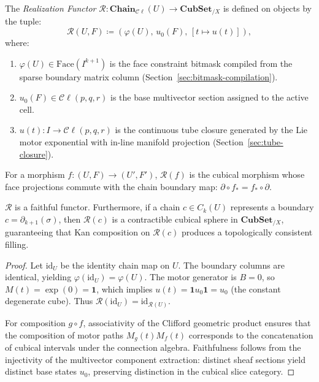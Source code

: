 \documentclass[acmsmall,screen,nonacm]{acmart}
\newcommand{\Cl}{\mathcal{C}\ell}
\newcommand{\Chain}{\mathbf{Chain}}
\newcommand{\CubSet}{\mathbf{CubSet}}
\newcommand{\Real}{\mathcal{R}}
\begin{document}
\begin{definition}
\label{def:realization-functor}
The \emph{Realization Functor} $\Real : \Chain_{\Cl}(U) \longrightarrow \CubSet_{/X}$ is defined on objects by the tuple:
\[
  \Real(U, F) \coloneqq \left( \varphi(U),\, u_0(F),\, [t \mapsto u(t)] \right),
\]
where:
\begin{enumerate}
    \item $\varphi(U) \in \mathrm{Face}(I^{k+1})$ is the face constraint bitmask compiled from the sparse boundary matrix column (Section~\ref{sec:bitmask-compilation}).
    \item $u_0(F) \in \Cl(p,q,r)$ is the base multivector section assigned to the active cell.
    \item $u(t) : I \to \Cl(p,q,r)$ is the continuous tube closure generated by the Lie motor exponential with in-line manifold projection (Section~\ref{sec:tube-closure}).
\end{enumerate}
For a morphism $f : (U, F) \to (U', F')$, $\Real(f)$ is the cubical morphism whose face projections commute with the chain boundary map: $\partial \circ f_* = f_* \circ \partial$.
\end{definition}

\begin{theorem}
$\Real$ is a faithful functor. Furthermore, if a chain $c \in C_k(U)$ represents a boundary $c = \partial_{k+1}(\sigma)$, then $\Real(c)$ is a contractible cubical sphere in $\CubSet_{/X}$, guaranteeing that Kan composition on $\Real(c)$ produces a topologically consistent filling.
\end{theorem}

\begin{proof}
Let $\mathrm{id}_U$ be the identity chain map on $U$. The boundary columns are identical, yielding $\varphi(\mathrm{id}_U) = \varphi(U)$. The motor generator is $B = 0$, so $M(t) = \exp(0) = \mathbf{1}$, which implies $u(t) = \mathbf{1} u_0 \mathbf{1} = u_0$ (the constant degenerate cube). Thus $\Real(\mathrm{id}_U) = \mathrm{id}_{\Real(U)}$. 

For composition $g \circ f$, associativity of the Clifford geometric product ensures that the composition of motor paths $M_g(t) M_f(t)$ corresponds to the concatenation of cubical intervals under the connection algebra. Faithfulness follows from the injectivity of the multivector component extraction: distinct sheaf sections yield distinct base states $u_0$, preserving distinction in the cubical slice category.
\end{proof}
\end{document}
